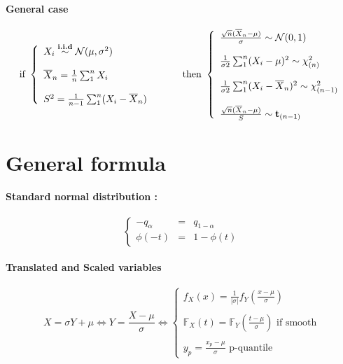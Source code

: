 \documentclass[a4paper,10pt]{article}
\begin{document}
\paragraph{General case}
\[
\text{if }
\left\{
\begin{array}{l}
X_i \stackrel{\textbf{i.i.d}}{\sim} \mathcal{N}(\mu, \sigma^2) \\ \\
\overline{X}_n = \frac{1}{n}\sum^n_1 X_i \\ \\
S^2 = \frac{1}{n-1}\sum^n_1 (X_i - \overline{X}_n)  
\end{array}\right.
\hspace{10mm}
\text{then }
\left\{
\begin{array}{l}
\frac{\sqrt{n} (\overline{X}_n - \mu)}{\sigma} \sim \mathcal{N}(0,1) \\ \\
\frac{1}{\sigma2}\sum^n_1 (X_i - \mu)^2 \sim \chi^2_{(n)} \\ \\
\frac{1}{\sigma2}\sum^n_1 (X_i - \overline{X}_n)^2 \sim \chi^2_{(n-1)} \\ \\
\frac{\sqrt{n} (\overline{X}_n - \mu)}{S} \sim \textbf{t}_{(n-1)}
\end{array}\right.
\]

\section{General formula}
\paragraph{Standard normal distribution :} 
\[
\left\{
\begin{array}{rcl}
-q_{\alpha} &=& q_{1-\alpha}   \\
\phi(-t)    &=& 1 - \phi(t)
\end{array}\right.
\]
\paragraph{Translated and Scaled variables}
\[
X=\sigma Y+\mu 
\Longleftrightarrow
Y=\frac{X-\mu}{\sigma}
\Longleftrightarrow
\left\{
\begin{array}{l}
f_{X}(x) = \frac{1}{|\sigma|} f_{Y}(\frac{x-\mu}{\sigma}) \\ \\
\mathbb{F}_{X}(t) = \mathbb{F}_{Y}(\frac{t-\mu}{\sigma}) \text{ if smooth} \\ \\
y_{p} =  \frac{x_{p}-\mu}{\sigma} \text{ p-quantile}
\end{array}\right.
\]
\end{document}
